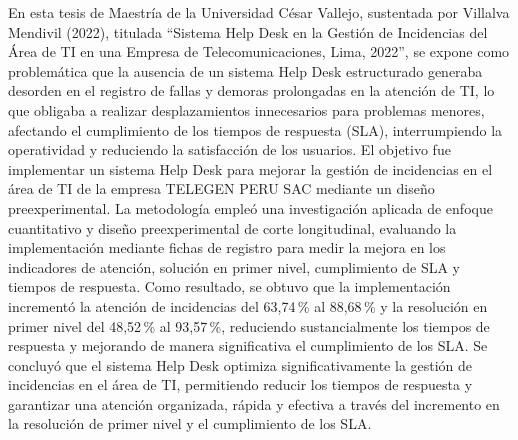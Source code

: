 En esta tesis de Maestría de la Universidad César Vallejo, sustentada por Villalva Mendivil (2022), titulada ``Sistema Help Desk en la Gestión de Incidencias del Área de TI en una Empresa de Telecomunicaciones, Lima, 2022'', se expone como problemática que la ausencia de un sistema Help Desk estructurado generaba desorden en el registro de fallas y demoras prolongadas en la atención de TI, lo que obligaba a realizar desplazamientos innecesarios para problemas menores, afectando el cumplimiento de los tiempos de respuesta (SLA), interrumpiendo la operatividad y reduciendo la satisfacción de los usuarios. El objetivo fue implementar un sistema Help Desk para mejorar la gestión de incidencias en el área de TI de la empresa TELEGEN PERU SAC mediante un diseño preexperimental. La metodología empleó una investigación aplicada de enfoque cuantitativo y diseño preexperimental de corte longitudinal, evaluando la implementación mediante fichas de registro para medir la mejora en los indicadores de atención, solución en primer nivel, cumplimiento de SLA y tiempos de respuesta. Como resultado, se obtuvo que la implementación incrementó la atención de incidencias del 63,74\,\% al 88,68\,\% y la resolución en primer nivel del 48,52\,\% al 93,57\,\%, reduciendo sustancialmente los tiempos de respuesta y mejorando de manera significativa el cumplimiento de los SLA. Se concluyó que el sistema Help Desk optimiza significativamente la gestión de incidencias en el área de TI, permitiendo reducir los tiempos de respuesta y garantizar una atención organizada, rápida y efectiva a través del incremento en la resolución de primer nivel y el cumplimiento de los SLA.

\vspace{0.8em}


